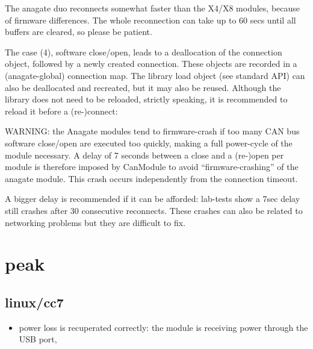 \documentclass[letterpaper,10pt,english]{sphinxmanual}
\begin{document}
The anagate duo reconnects somewhat faster than the X4/X8 modules, because of firmware differences.
The whole reconnection can take up to 60 secs until all buffers are cleared, so please be patient.

The case (4), software close/open, leads to a deallocation of the connection object, followed by a newly
created connection. These objects are recorded in a (anagate-global) connection map. The library
load object (see standard API) can also be deallocated and recreated, but it may also be reused.
Although the library does not need to be reloaded, strictly speaking, it is recommended to reload it
before a (re-)connect:

\begin{sphinxVerbatim}[commandchars=\\\{\}]
            
    
\end{sphinxVerbatim}

WARNING: the Anagate modules tend to firmware-crash if too many CAN bus software close/open are
executed too quickly, making a full power-cycle of the module necessary. A delay of 7 seconds
between a close and a (re-)open per module is therefore imposed by CanModule to avoid
“firmware-crashing” of the anagate module. This crash occurs independently from the connection
timeout.

A bigger delay is recommended if it can be afforded: lab-tests show a 7sec delay still crashes
after 30 consecutive reconnects. These crashes can also be related to networking problems but
they are difficult to fix.


\section{peak}
\label{\detokenize{reconnection:peak}}

\subsection{linux/cc7}
\label{\detokenize{reconnection:linux-cc7}}\begin{itemize}
\item {} 
power loss is recuperated correctly: the module is receiving power through the USB port,

\end{itemize}
\end{document}
